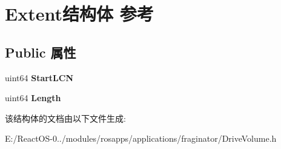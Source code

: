 \hypertarget{struct_extent}{}\section{Extent结构体 参考}
\label{struct_extent}
\subsection*{Public 属性}
\begin{DoxyCompactItemize}
\item 
\mbox{\label{struct_extent_a4057e3b456e921300c4dbf3284f208c5}} 
uint64 {\bfseries Start\+L\+CN}
\item 
\mbox{\label{struct_extent_a6193ea3888d21e27675b56108a4dd916}} 
uint64 {\bfseries Length}
\end{DoxyCompactItemize}


该结构体的文档由以下文件生成\+:\begin{DoxyCompactItemize}
\item 
E\+:/\+React\+O\+S-\/0../modules/rosapps/applications/fraginator/Drive\+Volume.\+h\end{DoxyCompactItemize}
